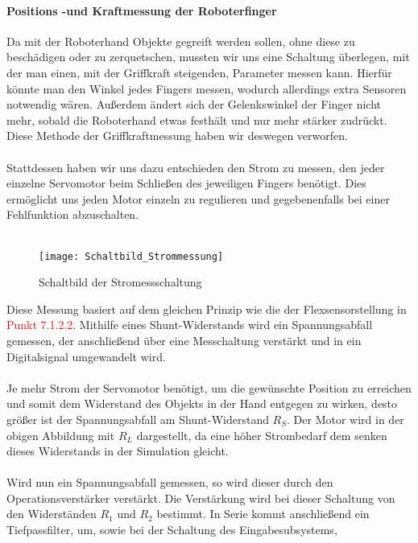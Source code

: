 \documentclass[titlepage,12pt,twoside]{article}
\begin{document}
\paragraph{Positions -und Kraftmessung der Roboterfinger}
\hfill \break
\hfill \break
Da mit der Roboterhand Objekte gegreift werden sollen, ohne diese zu beschädigen oder zu zerquetschen, mussten wir uns eine Schaltung überlegen,
mit der man einen, mit der Griffkraft steigenden, Parameter messen kann. Hierfür könnte man den Winkel jedes Fingers messen, wodurch
allerdings extra Sensoren notwendig wären. Außerdem ändert sich der Gelenkswinkel der Finger nicht mehr, sobald die Roboterhand
etwas festhält und nur mehr stärker zudrückt. Diese Methode der Griffkraftmessung haben wir deswegen verworfen. \\
\\
Stattdessen haben wir uns dazu entschieden den Strom zu messen, den jeder einzelne Servomotor beim Schließen des jeweiligen Fingers
benötigt. Dies ermöglicht uns jeden Motor einzeln zu regulieren und gegebenenfalls bei einer Fehlfunktion abzuschalten. \\
\\
\begin{figure}[H]
	\begin{center}
		\scalebox{1.2}
		{\texttt{[image: Schaltbild\_Strommessung]}}
		\caption{Schaltbild der Stromessschaltung}
		\label{fig:Schaltbild_Strommessung}		
	\end{center}
\end{figure}
\hfill \break
Diese Messung basiert auf dem gleichen Prinzip wie die der Flexsensorstellung in \textcolor{red}{Punkt 7.1.2.2}. Mithilfe eines 
Shunt-Widerstands wird ein Spannungsabfall gemessen, der anschließend über eine Messchaltung verstärkt und in ein Digitalsignal
umgewandelt wird. \\
\\
Je mehr Strom der Servomotor benötigt, um die gewünschte Position zu erreichen und somit dem Widerstand des Objekts in der Hand entgegen
zu wirken, desto größer ist der Spannungsabfall am Shunt-Widerstand $R_{S}$. Der Motor wird in der obigen Abbildung mit $R_{L}$ dargestellt,
da eine höher Strombedarf dem senken dieses Widerstands in der Simulation gleicht. \\
\\
Wird nun ein Spannungsabfall gemessen, so wird dieser durch den Operationsverstärker verstärkt. Die Verstärkung wird bei dieser Schaltung von 
den Widerständen $R_{1}$ und $R_{2}$ bestimmt. In Serie kommt anschließend ein Tiefpassfilter, um, sowie bei der Schaltung des Eingabesubsystems,
\end{document}
